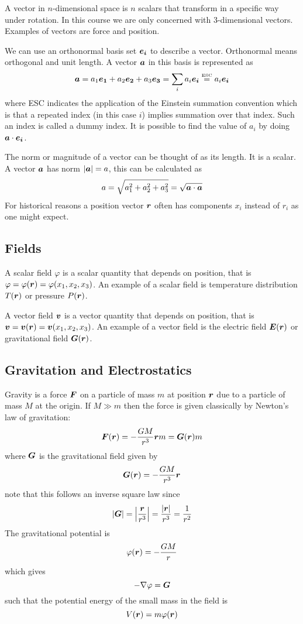 \documentclass{article}
\newcommand{\esc}{\overset{\text{\tiny ESC}}{=}}
\begin{document}
    A vector in \(n\)-dimensional space is \(n\) scalars that transform in a specific way under rotation.
    In this course we are only concerned with 3-dimensional vectors.
    Examples of vectors are force and position.
    
    We can use an orthonormal basis set \({\bm{e_{i}}}\) to describe a vector. Orthonormal means orthogonal and unit length.
    A vector \(\bm{a}\) in this basis is represented as
    \[\vv a = a_1\ve 1 + a_2\ve 2 + a_3\ve 3 = \sum_i a_i\ve i \esc a_i\ve i\]
    where ESC indicates the application of the Einstein summation convention which is that a repeated index (in this case \(i\)) implies summation over that index.
    Such an index is called a dummy index.
    It is possible to find the value of \(a_i\) by doing \(\bm{a}\cdot \bm{e_{i}}\).
    
    The norm or magnitude of a vector can be thought of as its length. 
    It is a scalar.
    A vector \(\bm{a}\) has norm \(|\bm{a}| = a\), this can be calculated as
    \[a = \sqrt{a_1^2 + a_2^2 + a_3^2} = \sqrt{\bm{a}\cdot \bm{a}}\]
    For historical reasons a position vector \(\bm{r}\) often has components \(x_i\) instead of \(r_i\) as one might expect.
    
    \subsection{Fields}
    A scalar field \(\varphi\) is a scalar quantity that depends on position, that is \(\varphi = \varphi(\bm{r}) = \varphi(x_1, x_2, x_3)\).
    An example of a scalar field is temperature distribution \(T(\bm{r})\) or pressure \(P(\bm{r})\).
    
    A vector field \(\bm{v}\) is a vector quantity that depends on position, that is \(\bm{v} = \bm{v}(\bm{r}) = \bm{v}(x_1, x_2, x_3)\).
    An example of a vector field is the electric field \(\bm{E}(\bm{r})\) or gravitational field \(\bm{G}(\bm{r})\).
    
    \subsection{Gravitation and Electrostatics}
    Gravity is a force \(\bm{F}\) on a particle of mass \(m\) at position \(\bm{r}\) due to a particle of mass \(M\) at the origin.
    If \(M\gg m\) then the force is given classically by Newton's law of gravitation:
    \[\bm{F}(\bm{r}) = - \frac{GM}{r^3}\bm{r} m = \bm{G}(\bm{r})m\]
    where \(\bm{G}\) is the gravitational field given by
    \[\bm{G}(\bm{r}) = -\frac{GM}{r^3}\bm{r}\]
    note that this follows an inverse square law since
    \[|\bm{G}| = \left|\frac{\bm{r}}{r^3}\right| = \frac{|\bm{r}|}{r^3} = \frac{1}{r^2}\]
    The gravitational potential is
    \[\varphi(\bm{r}) = -\frac{GM}{r}\]
    which gives
    \[-\nabla \varphi = \bm{G}\]
    such that the potential energy of the small mass in the field is
    \[V(\bm{r}) = m\varphi(\bm{r})\]
    
\end{document}
